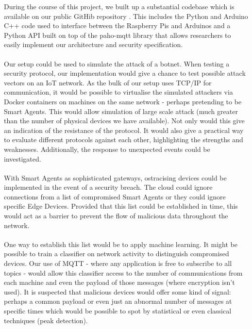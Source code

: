 During the course of this project, we built up a substantial codebase which is available on our public GitHib repository \cite{githubrepo}. This includes the Python and Arduino C++ code used to interface between the Raspberry Pis and Arduinos and a Python API built on top of the paho-mqtt library that allows researchers to easily implement our architecture and security specification.

\paragraph{}
Our setup could be used to simulate the attack of a botnet. When testing a security protocol, our implementation would give a chance to test possible attack vectors on an IoT network. As the bulk of our setup uses TCP/IP for communication, it would be possible to virtualise the simulated attackers via Docker containers on machines on the same network - perhaps pretending to be Smart Agents. This would allow simulation of large scale attack (much greater than the number of physical devices we have available). Not only would this give an indication of the resistance of the protocol. It would also give a practical way to evaluate different protocols against each other, highlighting the strengths and weaknesses. Additionally, the response to unexpected events could be investigated.

\paragraph{}
With Smart Agents as sophisticated gateways, ostracising devices could be implemented in the event of a security breach. The cloud could ignore connections from a list of compromised Smart Agents or they could ignore specific Edge Devices. Provided that this list could be established in time, this would act as a barrier to prevent the flow of malicious data throughout the network.

\paragraph{}
One way to establish this list would be to apply machine learning. It might be possible to train a classifier on network activity to distinguish compromised devices. Our use of MQTT - where any application is free to subscribe to all topics - would allow this classifier access to the number of communications from each machine and even the payload of those messages (where encryption isn't used). It is suspected that malicious devices would offer some kind of signal: perhaps a common payload or even just an abnormal number of messages at specific times which would be possible to spot by statistical or even classical techniques (peak detection).
